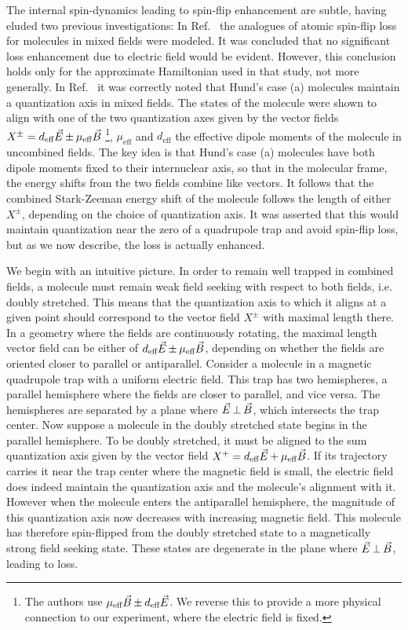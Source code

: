 \documentclass[%
 reprint,
 amsmath,amssymb,
 aps,
pra,
]{revtex4-1}
\newcommand{\epb}{{$\vec{E}\s {\perp}\s\vec{B}$}}
\newcommand{\s}{{\nobreak\hspace{.2em}}}
\begin{document}
The internal spin-dynamics leading to spin-flip enhancement are subtle, having eluded two previous investigations:
In Ref.~\cite{Lara2008} the analogues of atomic spin-flip loss for molecules in mixed fields were modeled. 
It was concluded that no significant loss enhancement due to electric field would be evident. However, this conclusion holds only for the approximate Hamiltonian used in that study, not more generally. In Ref.~\cite{Bohn2013} it was correctly noted that Hund's case (a) molecules maintain a quantization axis in mixed fields.
The states of the molecule were shown to align with one of the two quantization axes given by the vector fields $X^{\pm}=d_\text{eff}\vec{E} \s {\pm}\s  \mu_\text{eff}\vec{B}$
\s\footnote{The authors use $\mu_\text{eff}\vec{B} \s {\pm}\s  d_\text{eff}\vec{E}$. We reverse this to provide a more physical connection to our experiment, where the electric field is fixed.},
$\mu_\text{eff}$ and $d_\text{eff}$ the effective dipole moments of the molecule in uncombined fields.
The key idea is that Hund's case (a) molecules have both dipole moments fixed to their internuclear axis, so that in the molecular frame, the energy shifts from the two fields combine like vectors. 
It follows that the combined Stark-Zeeman energy shift of the molecule follows the length of either $X^{\pm}$, depending on the choice of quantization axis.
It was asserted that this would maintain quantization near the zero of a quadrupole trap and avoid spin-flip loss, but as we now describe, the loss is actually enhanced.

We begin with an intuitive picture.
In order to remain well trapped in combined fields, a molecule must remain weak field seeking with respect to both fields, i.e. doubly stretched.
This means that the quantization axis to which it aligns at a given point should correspond to the vector field $X^{\pm}$ with maximal length there.
In a geometry where the fields are continuously rotating, the maximal length vector field can be either of $d_\text{eff}\vec{E} \s {\pm}\s  \mu_\text{eff}\vec{B}$, depending on whether the fields are oriented closer to parallel or antiparallel.
Consider a molecule in a magnetic quadrupole trap with a uniform electric field.
This trap has two hemispheres, a parallel hemisphere where the fields are closer to parallel, and vice versa.
The hemispheres are separated by a plane where \epb{}, which intersects the trap center.
Now suppose a molecule in the doubly stretched state begins in the parallel hemisphere.
To be doubly stretched, it must be aligned to the sum quantization axis given by the vector field $X^{+} = d_\text{eff}\vec{E} \s {+}\s  \mu_\text{eff}\vec{B}$.
If its trajectory carries it near the trap center where the magnetic field is small, the electric field does indeed maintain the quantization axis and the molecule's alignment with it.
However when the molecule enters the antiparallel hemisphere, the magnitude of this quantization axis now decreases with increasing magnetic field. This molecule has therefore spin-flipped from the doubly stretched state to a magnetically strong field seeking state. These states are degenerate in the plane where \epb{}, leading to loss.
\end{document}
